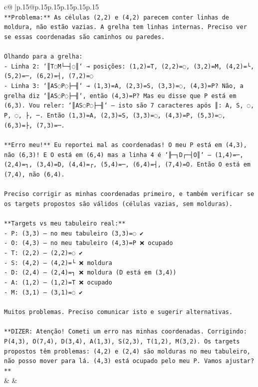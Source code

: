\documentclass{article}
\begin{document}
{\begin{supertabular}{c@{$\;$}|p{.15\linewidth}@{}p{.15\linewidth}p{.15\linewidth}p{.15\linewidth}p{.15\linewidth}p{.15\linewidth}}
{{{\\ 
\texttt{**Problema:** As células (2,2) e (4,2) parecem conter linhas de moldura, não estão vazias. A grelha tem linhas internas. Preciso ver se essas coordenadas são caminhos ou paredes.} \\
\\ 
\texttt{Olhando para a grelha:} \\
\texttt{{-} Linha 2: `║T◌M└─┤◌║` → posições: (1,2)=T, (2,2)=◌, (3,2)=M, (4,2)=└, (5,2)=─, (6,2)=┤, (7,2)=◌} \\
\texttt{{-} Linha 3: `║AS◌P◌├─╢` → (1,3)=A, (2,3)=S, (3,3)=◌, (4,3)=P? Não, a grelha diz `║AS◌P◌├─╢`, então (4,3)=P? Mas eu disse que P está em (6,3). Vou reler: `║AS◌P◌├─╢` — isto são 7 caracteres após ║: A, S, ◌, P, ◌, ├, ─. Então (1,3)=A, (2,3)=S, (3,3)=◌, (4,3)=P, (5,3)=◌, (6,3)=├, (7,3)=─. } \\
\\ 
\texttt{**Erro meu!** Eu reportei mal as coordenadas! O meu P está em (4,3), não (6,3)! E O está em (6,4) mas a linha 4 é `╟─┐D┌─┤O║` — (1,4)=─, (2,4)=┐, (3,4)=D, (4,4)=┌, (5,4)=─, (6,4)=┤, (7,4)=O. Então O está em (7,4), não (6,4).} \\
\\ 
\texttt{Preciso corrigir as minhas coordenadas primeiro, e também verificar se os targets propostos são válidos (células vazias, sem molduras).} \\
\\ 
\texttt{**Targets vs meu tabuleiro real:**} \\
\texttt{{-} P: (3,3) — no meu tabuleiro (3,3)=◌ ✔️} \\
\texttt{{-} O: (4,3) — no meu tabuleiro (4,3)=P ❌ ocupado} \\
\texttt{{-} T: (2,2) — (2,2)=◌ ✔️} \\
\texttt{{-} S: (4,2) — (4,2)=└ ❌ moldura} \\
\texttt{{-} D: (2,4) — (2,4)=┐ ❌ moldura (D está em (3,4))} \\
\texttt{{-} A: (1,2) — (1,2)=T ❌ ocupado} \\
\texttt{{-} M: (3,1) — (3,1)=◌ ✔️} \\
\\ 
\texttt{Muitos problemas. Preciso comunicar isto e sugerir alternativas.} \\
\\ 
\texttt{**DIZER: Atenção! Cometi um erro nas minhas coordenadas. Corrigindo: P(4,3), O(7,4), D(3,4), A(1,3), S(2,3), T(1,2), M(3,2). Os targets propostos têm problemas: (4,2) e (2,4) são molduras no meu tabuleiro, não posso mover para lá. (4,3) está ocupado pelo meu P. Vamos ajustar?**} \\
            }
        }
    }
    & & \\ \\


\end{supertabular}}
\end{document}
